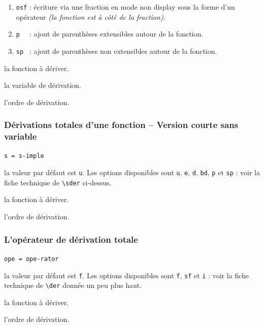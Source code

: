 \documentclass[12pt,a4paper]{book}
\newcommand\env[1]{\texttt{#1}}
\newcommand\macro[1]{\env{\textbackslash{}#1}}
\theoremstyle{definition}
\newcommand\mwhyprefix[2]{%
	\texttt{#1 = #1-#2}%
}
\begin{document}
{{\begin{enumerate}
	\item \verb+osf+ : écriture via une fraction en mode non display sous la forme d'un opérateur \emph{(la fonction est à côté de la fraction)}.

	\medskip
	
	\item \verb+p  + : ajout de parenthèses extensibles autour de la fonction.

	\item \verb+sp + : ajout de parenthèses non extensibles autour de la fonction.
\end{enumerate}


 la fonction à dériver.

 la variable de dérivation.

 l'ordre de dérivation.




\subsubsection{Dérivations totales d'une fonction -- Version courte sans variable} \label{tnsana-short-der}



 \hfill \mwhyprefix{s}{imple}

\IDoption{} la valeur par défaut est \verb+u+. Les options disponibles sont \verb+u+, \verb+e+, \verb+d+, \verb+bd+, \verb+p+ et \verb+sp+ : voir la fiche technique de \macro{sder} ci-dessus.

 la fonction à dériver.

 l'ordre de dérivation.




\subsubsection{L'opérateur de dérivation totale} \label{tnsana-ope-total-der}



 \hfill \mwhyprefix{ope}{rator}

\IDoption{} la valeur par défaut est \verb+f+. Les options disponibles sont \verb+f+, \verb+sf+ et \verb+i+ : voir la fiche technique de \macro{der} donnée un peu plus haut.

 la fonction à dériver.

 l'ordre de dérivation.


}}
\end{document}

